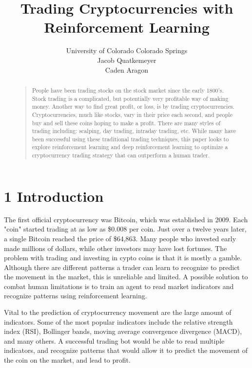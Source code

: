 \documentclass[letterpaper]{article}
\begin{document}
%
\title{Trading Cryptocurrencies with\\Reinforcement Learning}
\author{University of Colorado Colorado Springs\\Jacob Quatkemeyer\\Caden Aragon
}
\maketitle
\begin{abstract}
\begin{quote}
People have been trading stocks on the stock market since the early 1800's. Stock trading is a complicated, but potentially very profitable way of making money. Another way to find great
profit, or loss, is by trading cryptocurrencies. Cryptocurrencies, much like stocks, vary in their price each second, and people buy and sell these coins hoping to make a profit. There are many styles of trading including: scalping, day trading, intraday trading, etc. While many have been successful using these traditional trading techniques, this paper looks to explore reinforcement learning and deep reinforcement learning to optimize a cryptocurrency trading strategy that can outperform a human trader.
\end{quote}
\end{abstract}

\section{1 Introduction}
\noindent The first official cryptocurrency was Bitcoin, which was established in 2009. Each "coin" started trading at as low as \$0.008 per coin. Just over a twelve years later, a single Bitcoin reached the price of \$64,863. Many people who invested early made millions of dollars, while other investors may have lost fortunes. The problem with trading and investing in cypto coins is that it is mostly a gamble. Although there are different patterns a trader can learn to recognize to predict the movement in the market, this is unreliable and limited. A possible solution to combat human limitations is to train an agent to read market indicators and recognize patterns using reinforcement learning.

Vital to the prediction of cryptocurrency movement are the large amount of indicators. Some of the most popular indicators include the relative strength index (RSI), Bollinger bands, moving average convergence divergence (MACD), and many others. A successful trading bot would be able to read multiple indicators, and recognize patterns that would allow it to predict the movement of the coin on the market, and lead to profit. 
\end{document}
